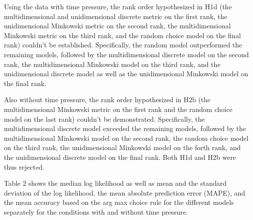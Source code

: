 \documentclass[a4paper,man,natbib]{apa6}
\begin{document}
Using the data with time pressure, the rank order hypothesized in H1d (the multidimensional and unidimensional discrete metric on the first rank, the unidimensional Minkowski metric on the second rank, the multidimensional Minkowski metric on the third rank, and the random choice model on the final rank) couldn't be established. Specifically, the random model outperformed the remaining models, followed by the multidimensional discrete model on the second rank, the multidimensional Minkowski model on the third rank, and the unidimensional discrete model as well as the unidimensional Minkowski model on the final rank. 

Also without time pressure, the rank order hypothesized in H2b (the multidimensional Minkowski metric on the first rank and the random choice model on the last rank) couldn't be demonstrated. Specifically, the multidimensional discrete model exceeded the remaining models, followed by the multidimensional Minkowski model on the second rank, the random choice model on the third rank, the unidimensional Minkowski model on the forth rank, and the unidimensional discrete model on the final rank. Both H1d and H2b were thus rejected.

Table 2 shows the median log likelihood as well as mean and the standard deviation of the log likelihood, the mean absolute prediction error (MAPE), and the mean accuracy based on the arg max choice rule for the different models separately for the conditions with and without time pressure.
\end{document}
